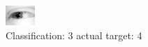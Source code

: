 \begin{figure}[h!]
\begin{center}
\includegraphics[width=0.60\columnwidth]{figures/ID2460_class_3_target_4.png}
\end{center}
\caption{ Classification: 3 actual target: 4}
\label{fig:ID2460_class_3_target_4}
\end{figure}

